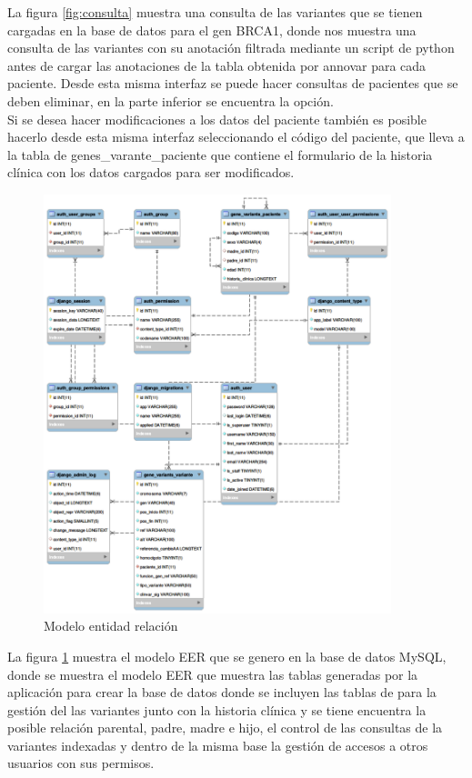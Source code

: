 La figura \ref{fig:consulta} muestra una consulta de las variantes que se tienen cargadas en la base de datos para el gen BRCA1, donde nos muestra una consulta de las variantes con su anotación  filtrada mediante un script de python antes de cargar las anotaciones de la tabla obtenida por annovar para cada paciente. Desde esta misma interfaz se puede hacer consultas de pacientes que se deben eliminar, en la parte inferior se encuentra la opción.\\

Si se desea hacer modificaciones a los datos del paciente también es posible hacerlo desde esta misma interfaz seleccionando el código del paciente, que lleva a la tabla de genes\_varante\_paciente que contiene el formulario de la historia clínica con los datos cargados para ser modificados. 

\begin{figure}[H]
	\centering
	\includegraphics[width=0.9\textwidth]{Kap3/modeloEER}
	\caption{Modelo entidad relación} \label{fig:t}
\end{figure}

La figura \ref{fig:t} muestra el modelo EER que se genero en la base de datos MySQL, donde se muestra el modelo  EER que muestra las tablas generadas por la aplicación para crear la base de datos donde se incluyen las tablas de para la gestión del las variantes junto con la historia clínica y se tiene encuentra la posible relación parental, padre, madre e hijo, el control de las consultas de la variantes indexadas y dentro de la misma base la gestión de accesos a otros usuarios con sus permisos.

